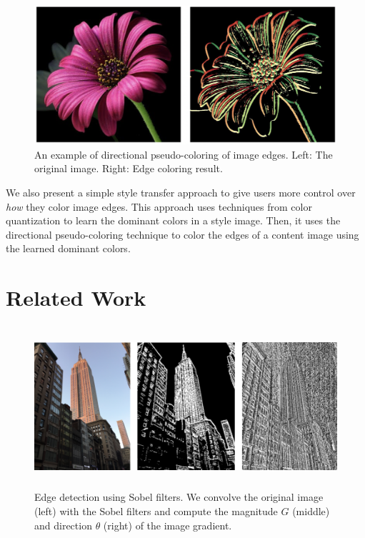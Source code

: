 \documentclass{article}
\begin{document}
\begin{figure}[t]
\begin{center}
\includegraphics[width=1.0\linewidth]{images/intro_example.png}
\end{center}
\caption{An example of directional pseudo-coloring of image edges. Left: The original image. Right: Edge coloring result. }
\end{figure}

We also present a simple style transfer approach to give users more control over \textit{how} they color image edges. This approach uses techniques from color quantization to learn the dominant colors in a style image. Then, it uses the directional pseudo-coloring technique to color the edges of a content image using the learned dominant colors.

\section{Related Work}

\begin{figure}[h]
\centering
\includegraphics[height=6cm]{images/edge.png}
\caption{Edge detection using Sobel filters. We convolve the original image (left) with the Sobel filters and compute the magnitude $G$ (middle) and direction $\theta$ (right) of the image gradient.}
\end{figure}
\end{document}

